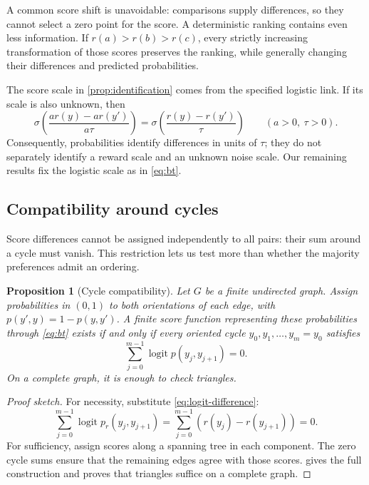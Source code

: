 \documentclass[11pt,twoside]{article}
\newtheorem{proposition}[theorem]{Proposition}
\theoremstyle{definition}
\theoremstyle{remark}
\begin{document}
A common score shift is unavoidable: comparisons supply differences,
so they cannot select a zero point for the score. A deterministic ranking
contains even less information. If $r(a)>r(b)>r(c)$, every strictly
increasing transformation of those scores preserves the ranking, while
generally changing their differences and predicted probabilities.

The score scale in \cref{prop:identification} comes from the specified
logistic link. If its scale is also unknown, then
\begin{equation}
 \sigma\!\left(\frac{ar(y)-ar(y')}{a\tau}\right)
 =\sigma\!\left(\frac{r(y)-r(y')}{\tau}\right)
 \qquad(a>0,\ \tau>0).
 \label{eq:unknown-scale}
\end{equation}
Consequently, probabilities identify differences in units of $\tau$;
they do not separately identify a reward scale and an unknown noise scale.
Our remaining results fix the logistic scale as in \cref{eq:bt}.

\subsection{Compatibility around cycles}

Score differences cannot be assigned independently to all pairs: their sum
around a cycle must vanish. This restriction lets us test more than whether
the majority preferences admit an ordering.

\begin{proposition}[Cycle compatibility]
\label{prop:cycles}
Let $G$ be a finite undirected graph. Assign probabilities in $(0,1)$ to
both orientations of each edge, with $p(y',y)=1-p(y,y')$. A finite score
function representing these probabilities through \cref{eq:bt} exists
if and only if every oriented cycle $y_0,y_1,\ldots,y_m=y_0$ satisfies
\begin{equation}
 \sum_{j=0}^{m-1}\operatorname{logit}p(y_j,y_{j+1})=0.
 \label{eq:cycles}
\end{equation}
On a complete graph, it is enough to check triangles.
\end{proposition}

\begin{proof}[Proof sketch]
For necessity, substitute \cref{eq:logit-difference}:
\[
 \sum_{j=0}^{m-1}\operatorname{logit}p_r(y_j,y_{j+1})
 =\sum_{j=0}^{m-1}(r(y_j)-r(y_{j+1}))=0.
\]
For sufficiency, assign scores along a spanning tree in each component.
The zero cycle sums ensure that the remaining edges agree with those scores.
 gives the full construction and proves that triangles
suffice on a complete graph.
\end{proof}
\end{document}
